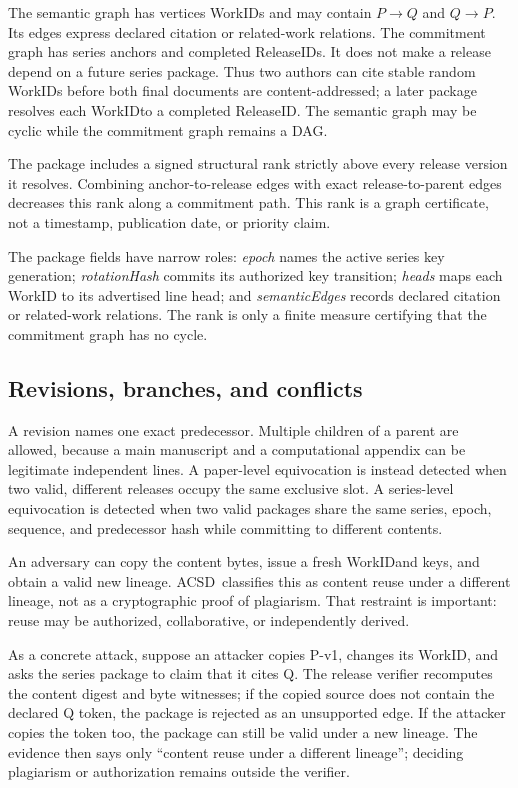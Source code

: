 \documentclass[11pt]{article}
\newcommand{\workid}{\textsf{WorkID}}
\newcommand{\releaseid}{\textsf{ReleaseID}}
\newcommand{\acsd}{\textsc{ACSD}}
\begin{document}
The semantic graph has vertices \workid s and may contain $P \rightarrow Q$ and $Q \rightarrow P$. Its edges express declared citation or related-work relations. The commitment graph has series anchors and completed \releaseid s. It does not make a release depend on a future series package. Thus two authors can cite stable random \workid s before both final documents are content-addressed; a later package resolves each \workid to a completed \releaseid. The semantic graph may be cyclic while the commitment graph remains a DAG.

The package includes a signed structural rank strictly above every release version it resolves. Combining anchor-to-release edges with exact release-to-parent edges decreases this rank along a commitment path. This rank is a graph certificate, not a timestamp, publication date, or priority claim.

The package fields have narrow roles: \textit{epoch} names the active series
key generation; \textit{rotationHash} commits its authorized key transition;
\textit{heads} maps each WorkID to its advertised line head; and
\textit{semanticEdges} records declared citation or related-work relations.
The rank is only a finite measure certifying that the commitment graph has no
cycle.

\subsection{Revisions, branches, and conflicts}

A revision names one exact predecessor. Multiple children of a parent are allowed, because a main manuscript and a computational appendix can be legitimate independent lines. A paper-level equivocation is instead detected when two valid, different releases occupy the same exclusive slot. A series-level equivocation is detected when two valid packages share the same series, epoch, sequence, and predecessor hash while committing to different contents.

An adversary can copy the content bytes, issue a fresh \workid and keys, and obtain a valid new lineage. \acsd\ classifies this as content reuse under a different lineage, not as a cryptographic proof of plagiarism. That restraint is important: reuse may be authorized, collaborative, or independently derived.

As a concrete attack, suppose an attacker copies P-v1, changes its WorkID,
and asks the series package to claim that it cites Q. The release verifier
recomputes the content digest and byte witnesses; if the copied source does not
contain the declared Q token, the package is rejected as an unsupported edge.
If the attacker copies the token too, the package can still be valid under a
new lineage. The evidence then says only “content reuse under a different
lineage”; deciding plagiarism or authorization remains outside the verifier.
\end{document}

